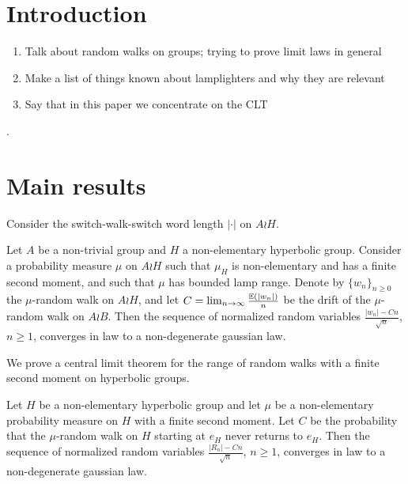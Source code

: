 \section{Introduction}
\begin{enumerate}
\item	Talk about random walks on groups; trying to prove limit laws in general
\item Make a list of things known about lamplighters and why they are relevant
\item Say that in this paper we concentrate on the CLT
\end{enumerate}
\cite{BenoistQuint2016,BenoistQuint2016hyperbolic,Bjorklund2010,Choi2023,ErschlerZheng2022,GekhtmanTaylorTiozzo2022,Gilch2022,Gouezel2017,Horbez2018,LeBars2022,Ledrappier2001,MrazovicSandriSebek2023,Salaun2001,SawyerSteger1987}.


\section{Main results}

Consider the switch-walk-switch word length $|\cdot |$ on $A\wr H$.

\begin{thm}
	Let $A$ be a non-trivial group and $H$ a non-elementary hyperbolic group. Consider a probability measure $\mu$ on $A\wr H$ such that $\mu_H$ is non-elementary and has a finite second moment, and such that $\mu$ has bounded lamp range. Denote by $\{w_n\}_{n\ge 0}$ the $\mu$-random walk on $A\wr H$, and let $C=\lim_{n\to \infty}\frac{\mathbb{E}(|w_n|)}{n}$ be the drift of the $\mu$-random walk on $A\wr B$. Then the sequence of normalized random variables $\frac{|w_n|-Cn}{\sqrt{n}}$, $n\ge 1$, converges in law to a non-degenerate gaussian law.
\end{thm}


We prove a central limit theorem for the range of random walks with a finite second moment on hyperbolic groups.
\begin{thm}\label{thm: CLT range on hyperbolic groups}
	Let $H$ be a non-elementary hyperbolic group and let $\mu$ be a non-elementary probability measure on $H$ with a finite second moment. Let $C$ be the probability that the $\mu$-random walk on $H$ starting at $e_H$ never returns to $e_H$. Then the sequence of normalized random variables $\frac{|R _{n} | - Cn}{\sqrt{n}}$, $n\ge 1$, converges in law to a non-degenerate gaussian law.
\end{thm}